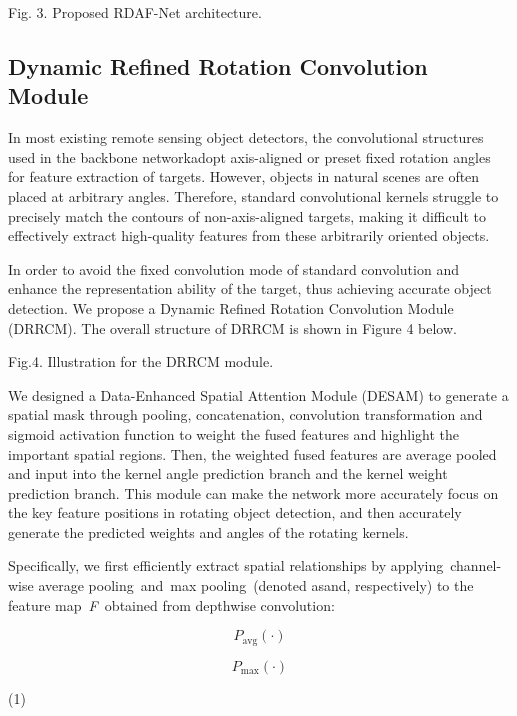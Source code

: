 \documentclass[journal]{IEEEtran}
\begin{document}
Fig. 3. Proposed RDAF-Net architecture.

\subsection{ Dynamic Refined Rotation Convolution Module }

In most existing remote sensing object detectors, the convolutional structures used in the backbone networkadopt axis-aligned or preset fixed rotation angles for feature extraction of targets. However, objects in natural scenes are often placed at arbitrary angles. Therefore, standard convolutional kernels struggle to precisely match the contours of non-axis-aligned targets, making it difficult to effectively extract high-quality features from these arbitrarily oriented objects.

In order to avoid the fixed convolution mode of standard convolution and enhance the representation ability of the target, thus achieving accurate object detection. We propose a Dynamic Refined Rotation Convolution Module (DRRCM). The overall structure of DRRCM is shown in Figure 4 below.

Fig.4. Illustration for the DRRCM module.

We designed a Data-Enhanced Spatial Attention Module (DESAM) to generate a spatial mask through pooling, concatenation, convolution transformation and sigmoid activation function to weight the fused features and highlight the important spatial regions. Then, the weighted fused features are average pooled and input into the kernel angle prediction branch and the kernel weight prediction branch. This module can make the network more accurately focus on the key feature positions in rotating object detection, and then accurately generate the predicted weights and angles of the rotating kernels.

Specifically, we first efficiently extract spatial relationships by applying channel-wise average pooling and max pooling (denoted asand, respectively) to the feature map \textit{F }obtained from depthwise convolution:

\begin{equation}
P_{\text{avg}}(\cdot)
\label{eq:eq_4}
\end{equation}

\begin{equation}
P_{\text{max}}(\cdot)
\label{eq:eq_5}
\end{equation}

	(1)
\end{document}
